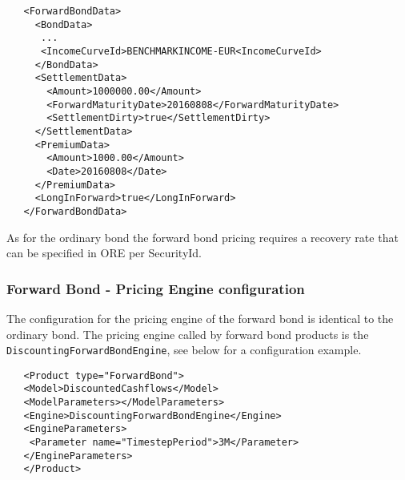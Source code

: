    \begin{verbatim}
   <ForwardBondData>
     <BondData>
      ...
      <IncomeCurveId>BENCHMARKINCOME-EUR<IncomeCurveId>
     </BondData>
     <SettlementData>
       <Amount>1000000.00</Amount>
       <ForwardMaturityDate>20160808</ForwardMaturityDate>
       <SettlementDirty>true</SettlementDirty>
     </SettlementData>
     <PremiumData>
       <Amount>1000.00</Amount>
       <Date>20160808</Date>
     </PremiumData>
     <LongInForward>true</LongInForward>
   </ForwardBondData>
   \end{verbatim}


As for the ordinary bond the forward bond pricing requires a recovery rate that can be specified in ORE per SecurityId.

\subsubsection*{Forward Bond - Pricing Engine configuration}

The configuration for the pricing engine of the forward bond is identical to the ordinary bond.%
The pricing engine called by forward bond products is the {\tt DiscountingForwardBondEngine}, see below for a configuration example.

   \begin{verbatim}
   <Product type="ForwardBond">
   <Model>DiscountedCashflows</Model>
   <ModelParameters></ModelParameters>
   <Engine>DiscountingForwardBondEngine</Engine>
   <EngineParameters>
    <Parameter name="TimestepPeriod">3M</Parameter>
   </EngineParameters>
   </Product>
   \end{verbatim}
